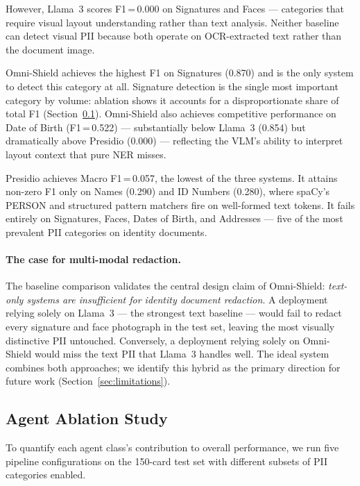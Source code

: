 However, Llama~3 scores F1\,=\,0.000 on Signatures
and Faces --- categories that require visual layout
understanding rather than text analysis.
Neither baseline can detect visual PII because both
operate on OCR-extracted text rather than the
document image.

Omni-Shield achieves the highest F1 on Signatures
(0.870) and is the only system to detect this
category at all.
Signature detection is the single most important
category by volume: ablation shows it accounts for
a disproportionate share of total F1
(Section~\ref{sec:ablation}).
Omni-Shield also achieves competitive performance
on Date of Birth (F1\,=\,0.522) --- substantially
below Llama~3 (0.854) but dramatically above
Presidio (0.000) --- reflecting the VLM's ability
to interpret layout context that pure NER misses.

Presidio achieves Macro F1\,=\,0.057, the lowest
of the three systems.
It attains non-zero F1 only on Names (0.290) and
ID Numbers (0.280), where spaCy's PERSON and
structured pattern matchers fire on well-formed
text tokens.
It fails entirely on Signatures, Faces, Dates of
Birth, and Addresses --- five of the most prevalent
PII categories on identity documents.

\paragraph{The case for multi-modal redaction.}
The baseline comparison validates the central design
claim of Omni-Shield: \emph{text-only systems are
insufficient for identity document redaction}.
A deployment relying solely on Llama~3 --- the
strongest text baseline --- would fail to redact
every signature and face photograph in the test
set, leaving the most visually distinctive PII
untouched.
Conversely, a deployment relying solely on
Omni-Shield would miss the text PII that Llama~3
handles well.
The ideal system combines both approaches; we
identify this hybrid as the primary direction for
future work (Section~\ref{sec:limitations}).

\subsection{Agent Ablation Study}
\label{sec:ablation}

To quantify each agent class's contribution to
overall performance, we run five pipeline
configurations on the 150-card test set with
different subsets of PII categories enabled.


